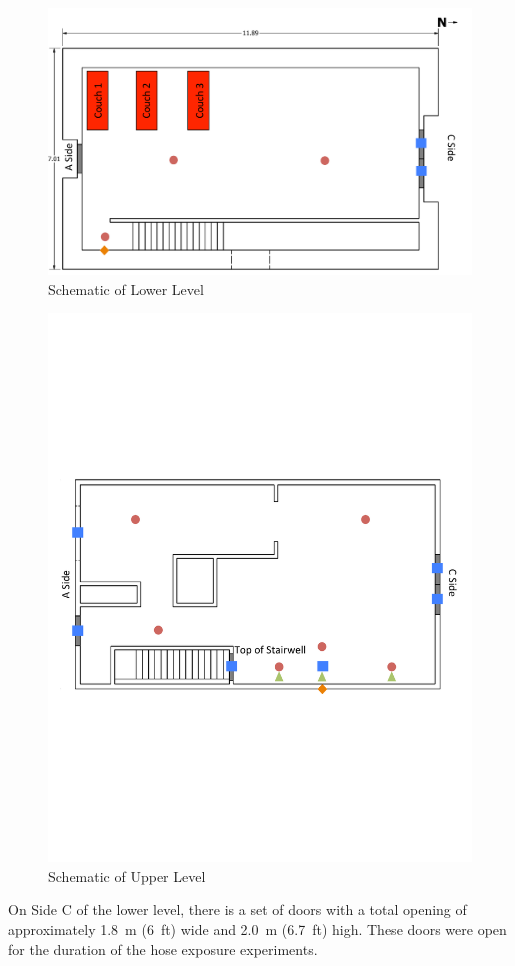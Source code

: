 \documentclass[letterpaper,11pt]{texMemo} %
\begin{document}
\begin{figure}[!ht]
\centering
\includegraphics[width=0.8\columnwidth]{../Figures/Hose_Figures/schematic_lower}
\caption{Schematic of Lower Level}
\label{fig:schematic_low}
\end{figure}

\begin{figure}[!ht]
\centering
\includegraphics[width=0.8\columnwidth]{../Figures/Hose_Figures/schematic_upper}
\caption{Schematic of Upper Level}
\label{fig:schematic_up}
\end{figure}

On Side C of the lower level, there is a set of doors with a total opening of approximately 1.8~m (6~ft) wide and 2.0~m (6.7~ft) high. These doors were open for the duration of the hose exposure experiments.  
\end{document}
